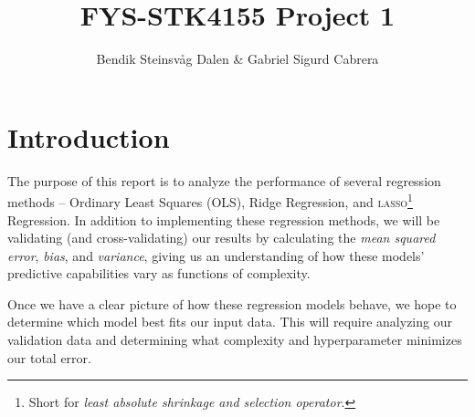 \documentclass[a4paper,10pt,english]{article}
\begin{document}
\title{FYS-STK4155 Project 1}
\author{Bendik Steinsvåg Dalen \& Gabriel Sigurd Cabrera}



\section*{Introduction}
\label{sec:introduction}

The purpose of this report is to analyze the performance of several regression methods – Ordinary Least Squares (OLS), Ridge Regression, and \textsc{lasso}\footnote{Short for \textit{least absolute shrinkage and selection operator}.} Regression.  In addition to implementing these regression methods, we will be validating (and cross-validating) our results by calculating the \textit{mean squared error}, \textit{bias}, and \textit{variance}, giving us an understanding of how these models' predictive capabilities vary as functions of complexity.

Once we have a clear picture of how these regression models behave, we hope to determine which model best fits our input data.  This will require analyzing our validation data and determining what complexity and hyperparameter minimizes our total error.
\end{document}
